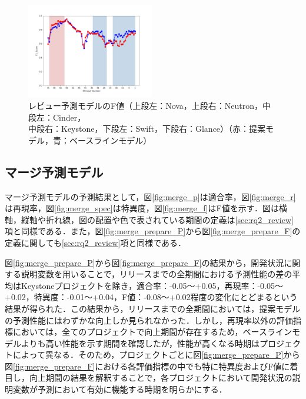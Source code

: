 \documentclass[11pt]{jreport}
\begin{document}
\begin{figure}[H]
\begin{center}
    \includegraphics[width=0.495\textwidth]{Uenaka_fig/RQ2_result/Glance_review_F1.pdf}
    \caption{レビュー予測モデルのF値（上段左：Nova，上段右：Neutron，中段左：Cinder，\\ 中段右：Keystone，下段左：Swift，下段右：Glance）（赤：提案モデル，青：ベースラインモデル）}
    \label{fig:review_f}
\end{center}
\end{figure}


\subsection{マージ予測モデル}
マージ予測モデルの予測結果として，図\ref{fig:merge_p}は適合率，図\ref{fig:merge_r}は再現率，図\ref{fig:merge_spec}は特異度，図\ref{fig:merge_f}はF値を示す．図は横軸，縦軸や折れ線，図の配置や色で表されている期間の定義は\ref{sec:rq2_review}項と同様である．また，図\ref{fig:merge_prepare_P}から図\ref{fig:merge_prepare_F}の定義に関しても\ref{sec:rq2_review}項と同様である．

図\ref{fig:merge_prepare_P}から図\ref{fig:merge_prepare_F}の結果から，開発状況に関する説明変数を用いることで，リリースまでの全期間における予測性能の差の平均はKeystoneプロジェクトを除き，適合率：-0.05〜+0.05，再現率：-0.05〜+0.02，特異度：-0.01〜+0.04，F値：-0.08〜+0.02程度の変化にとどまるという結果が得られた．この結果から，リリースまでの全期間においては，提案モデルの予測性能にはわずかな向上しか見られなかった．しかし，再現率以外の評価指標においては，全てのプロジェクトで向上期間が存在するため，ベースラインモデルよりも高い性能を示す期間を確認したが，性能が高くなる時期はプロジェクトによって異なる．そのため，プロジェクトごとに図\ref{fig:merge_prepare_P}から図\ref{fig:merge_prepare_F}における各評価指標の中でも特に特異度およびF値に着目し，向上期間の結果を解釈することで，各プロジェクトにおいて開発状況の説明変数が予測において有効に機能する時期を明らかにする．
\end{document}
